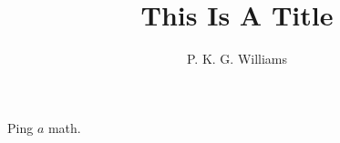 \documentclass{article}
\title{This Is A Title}
\author{P. K. G. Williams}
\begin{document}
Ping $a$ math.

\end{document}
